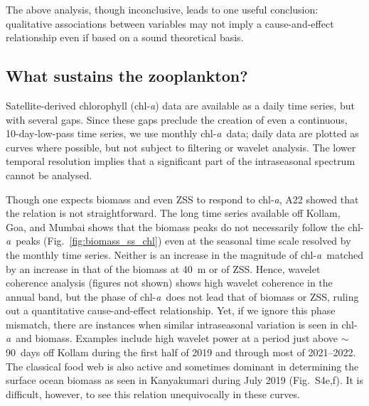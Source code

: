 \documentclass[authoryear,review,11pt]{elsarticle}
\newcommand{\chla}{chl-{\emph{a}}}
\begin{document}
The above analysis, though inconclusive, leads to one useful conclusion: qualitative associations between variables may not imply a cause-and-effect relationship even if based on a sound theoretical basis.





\subsection{What sustains the zooplankton?}
\label{sec:discuss.picomicro}

Satellite-derived chlorophyll (\chla) data are available as a daily time series, but with several gaps.  Since these gaps preclude the creation of even a continuous, 10-day-low-pass time series, we use monthly \chla\ data; daily data are plotted as curves where possible, but not subject to filtering or wavelet analysis.  The lower temporal resolution implies that a significant part of the intraseasonal spectrum cannot be analysed. 

Though one expects biomass and even ZSS to respond to \chla, A22 showed that the relation is not straightforward.  The long time series available off Kollam, Goa, and Mumbai shows that the biomass peaks do not necessarily follow the \chla\ peaks (Fig.~\ref{fig:biomass_ss_chl}) even at the seasonal time scale resolved by the monthly time series.  Neither is an increase in the magnitude of \chla\ matched by an increase in that of the biomass at 40~m or of ZSS.  Hence, wavelet coherence analysis (figures not shown) shows high wavelet coherence in the annual band, but the phase of \chla\ does not lead that of biomass or ZSS, ruling out a quantitative cause-and-effect relationship. Yet, if we ignore this phase mismatch, there are instances when similar intraseasonal variation is seen in \chla\ and biomass. Examples include high wavelet power at a period just above $\sim$90~days off Kollam during the first half of 2019 and through most of 2021--2022.  The classical food web is also active and sometimes dominant in determining the surface ocean biomass as seen in Kanyakumari during July 2019 (Fig.~S4e,f). It is difficult, however, to see this relation unequivocally in these curves.
\end{document}
